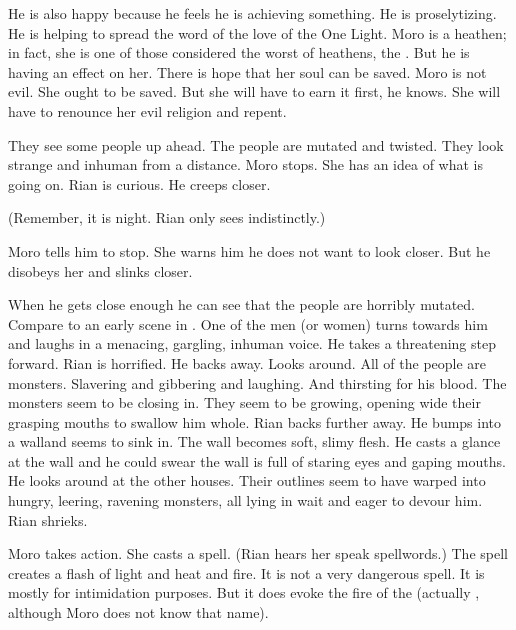 He is also happy because he feels he is achieving something. 
He is proselytizing. 
He is helping to spread the word of the love of the One Light. 
Moro is a heathen; in fact, she is one of those considered the worst of heathens, the \rethyaxes. 
But he is having an effect on her.
There is hope that her soul can be saved. 
Moro is not evil. 
She ought to be saved. 
But she will have to earn it first, he knows.
She will have to renounce her evil religion and repent.

\begin{comment}
  \section{Revelation of the Beyond}
\end{comment}
They see some people up ahead. 
The people are mutated and twisted. 
They look strange and inhuman from a distance. 
Moro stops.
She has an idea of what is going on. 
Rian is curious.
He creeps closer. 

(Remember, it is night. Rian only sees indistinctly.)

Moro tells him to stop.
She warns him he does not want to look closer. 
But he disobeys her and slinks closer. 

When he gets close enough he can see that the people are horribly mutated. 
Compare to an early scene in \cite{Movie:IntheMouthofMadness}. 
One of the men (or women) turns towards him and laughs in a menacing, gargling, inhuman voice. 
He takes a threatening step forward. 
Rian is horrified.
He backs away. 
Looks around. 
All of the people are monsters.
Slavering and gibbering and laughing.
And thirsting for his blood. 
The monsters seem to be closing in.
They seem to be growing, opening wide their grasping mouths to swallow him whole. 
Rian backs further away.
He bumps into a wall\prikker and seems to sink in.
The wall becomes soft, slimy flesh. 
He casts a glance at the wall and he could swear the wall is full of staring eyes and gaping mouths. 
He looks around at the other houses.
Their outlines seem to have warped into hungry, leering, ravening monsters, all lying in wait and eager to devour him. 
Rian shrieks. 

\begin{comment}
  \section{Moro scares off attackers}
\end{comment}
Moro takes action. 
She casts a spell. 
(Rian hears her speak spellwords.)
The spell creates a flash of light and heat and fire. 
It is not a very dangerous spell.
It is mostly for intimidation purposes. 
But it does evoke the fire of the \Primordials (actually \RuinSatha, although Moro does not know that name). 

